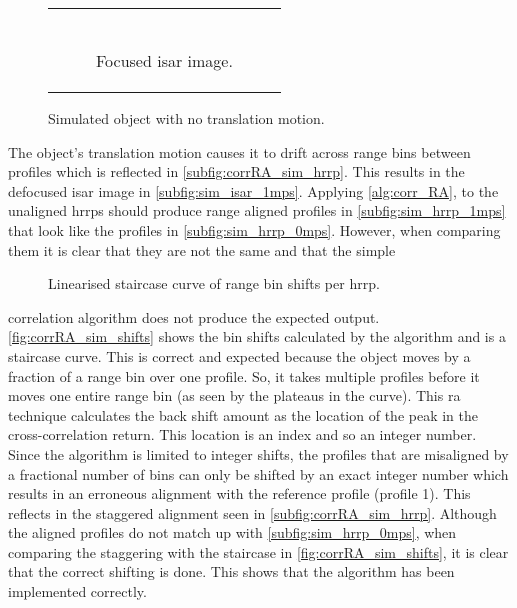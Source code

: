\documentclass[class=report,11pt,crop=false]{standalone}
\begin{document}
\begin{figure}[h]
\begin{minipage}{0.3\linewidth}
\begin{tabular}{@{}c@{}}
\begin{subfigure}{\linewidth}
            \end{subfigure}
            \\
            \begin{subfigure}{\linewidth}
                \centering
                \resizebox{\linewidth}{!}{}
                \caption{Focused \gls{isar} image.\label{subfig:sim_isar_0mps}}
            \end{subfigure}
        \end{tabular}
        \caption{Simulated object with no translation motion. \label{fig:sim_0mps}}
    \end{minipage}
    \end{figure}

    The object's translation motion causes it to drift across range bins between profiles which is reflected in \autoref{subfig:corrRA_sim_hrrp}. This results in the defocused \gls{isar} image in \autoref{subfig:sim_isar_1mps}. Applying \autoref{alg:corr_RA}, to the unaligned \gls{hrrp}s should produce range aligned profiles in \autoref{subfig:sim_hrrp_1mps} that look like the profiles in \autoref{subfig:sim_hrrp_0mps}. However, when comparing them it is clear that they are not the same and that the simple 
    \begin{wrapfigure}{l}{0.45\linewidth}
        \centering
        \resizebox{\linewidth}{!}{}
        \caption{Linearised staircase curve of range bin shifts per \gls{hrrp}.\label{fig:hayRA_sim_shifts}}
    \end{wrapfigure}
    correlation algorithm does not produce the expected output. \autoref{fig:corrRA_sim_shifts} shows the bin shifts calculated by the algorithm and is a staircase curve. This is correct and expected because the object moves by a fraction of a range bin over one profile. So, it takes multiple profiles before it moves one entire range bin (as seen by the plateaus in the curve). This \gls{ra} technique calculates the back shift amount as the location of the peak in the cross-correlation return. This location is an index and so an integer number. Since the algorithm is limited to integer shifts, the profiles that are misaligned by a fractional number of bins can only be shifted by an exact integer number which results in an erroneous alignment with the reference profile (profile 1). This reflects in the staggered alignment seen in \autoref{subfig:corrRA_sim_hrrp}. Although the aligned profiles do not match up with \autoref{subfig:sim_hrrp_0mps}, when comparing the staggering with the staircase in \autoref{fig:corrRA_sim_shifts}, it is clear that the correct shifting is done. This shows that the algorithm has been implemented correctly.
\end{document}
